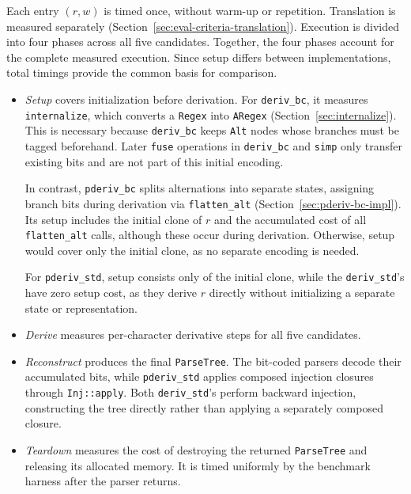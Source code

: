 Each entry $(r,w)$ is timed once, without warm-up or repetition.
Translation is measured separately
(Section~\ref{sec:eval-criteria-translation}).
Execution is divided into four phases across all five candidates.
Together, the four phases account for the complete
measured execution. Since setup differs between
implementations, total timings provide the common
basis for comparison.
\begin{itemize}
    \item \emph{Setup} covers initialization before derivation.
    For \texttt{deriv\_bc}, it measures
    \texttt{internalize}, which converts a \texttt{Regex} into \texttt{ARegex}
    (Section~\ref{sec:internalize}).
    This is necessary because \texttt{deriv\_bc}
    keeps \texttt{Alt} nodes whose branches must
    be tagged beforehand. Later \texttt{fuse}
    operations in \texttt{deriv\_bc} and \texttt{simp}
    only transfer existing bits and are not part
    of this initial encoding.

    In contrast, \texttt{pderiv\_bc} splits
    alternations into separate states, assigning
    branch bits during derivation via \texttt{flatten\_alt}
    (Section~\ref{sec:pderiv-bc-impl}).
    Its setup includes the initial clone of $r$
    and the accumulated cost of all \texttt{flatten\_alt}
    calls, although these occur during derivation.
    Otherwise, setup would cover only the initial clone,
    as no separate encoding is needed.

    For \texttt{pderiv\_std}, setup consists only
    of the initial clone, while the
    \texttt{deriv\_std}'s have zero setup cost,
    as they derive $r$ directly without
    initializing a separate state or representation.

    \item \emph{Derive} measures per-character
    derivative steps for all five candidates.

    \item \emph{Reconstruct} produces the final
    \texttt{ParseTree}. The bit-coded parsers
    decode their accumulated bits, while
    \texttt{pderiv\_std} applies composed injection
    closures through \texttt{Inj::apply}.
    Both \texttt{deriv\_std}'s perform
    backward injection, constructing the tree
    directly rather than applying a separately
    composed closure.

    \item \emph{Teardown} measures the cost of
    destroying the returned \texttt{ParseTree}
    and releasing its allocated memory.
    It is timed uniformly by the benchmark harness
    after the parser returns.
\end{itemize}

